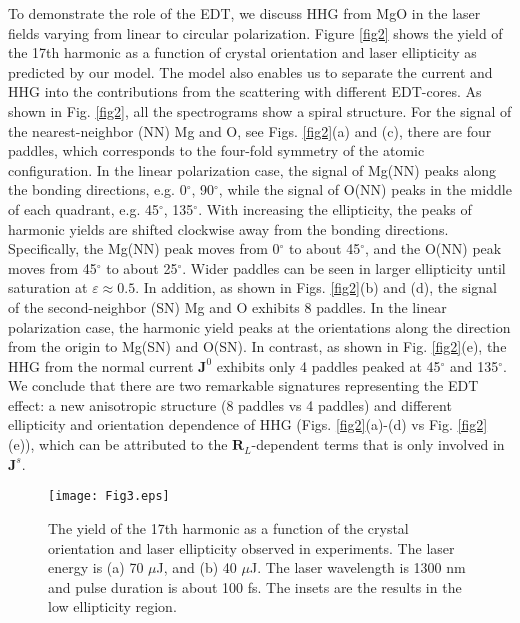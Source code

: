 \documentclass[aps,prl,10pt,preprint,nofootinbib]{revtex4-1}
\begin{document}
To demonstrate the role of the EDT, we discuss HHG from MgO in the laser fields varying from linear to circular polarization. Figure \ref{fig2} shows the yield of the 17th harmonic as a function of crystal orientation and laser ellipticity as predicted by our model. The model also enables us to separate the current and HHG into the contributions from the scattering with different EDT-cores. As shown in Fig. \ref{fig2}, all the spectrograms show a spiral structure. For the signal of the nearest-neighbor (NN) Mg and O, see Figs. \ref{fig2}(a) and (c), there are four paddles, which corresponds to the four-fold symmetry of the atomic configuration. In the linear polarization case, the signal of Mg(NN) peaks along the bonding directions, e.g. 0$^\circ$, 90$^\circ$, while the signal of O(NN) peaks in the middle of each quadrant, e.g. 45$^\circ$, 135$^\circ$. With increasing the ellipticity, the peaks of harmonic yields are shifted clockwise away from the bonding directions. Specifically, the Mg(NN) peak moves from 0$^\circ$ to about 45$^\circ$, and the O(NN) peak moves from 45$^\circ$ to about 25$^\circ$. Wider paddles can be seen in larger ellipticity until saturation at $\varepsilon\approx0.5$. In addition, as shown in Figs. \ref{fig2}(b) and (d), the signal of the second-neighbor (SN) Mg and O exhibits 8 paddles. In the linear polarization case, the harmonic yield peaks at the orientations along the direction from the origin to Mg(SN) and O(SN). In contrast, as shown in Fig. \ref{fig2}(e), the HHG from the normal current $\textbf{J}^{0}$ exhibits only 4 paddles peaked at 45$^\circ$ and 135$^\circ$. We conclude that there are two remarkable signatures representing the EDT effect: a new anisotropic structure (8 paddles vs 4 paddles) and different ellipticity and orientation dependence of HHG (Figs. \ref{fig2}(a)-(d) vs Fig. \ref{fig2}(e)), which can be attributed to the $\textbf{R}_{L}$-dependent terms that is only involved in $\textbf{J}^{s}$.

\begin{figure}[!t]
	\texttt{[image: Fig3.eps]}
	\caption{The yield of the 17th harmonic as a function of the crystal orientation and laser ellipticity observed in experiments. The laser energy is (a) 70 $\mu$J, and (b) 40 $\mu$J. The laser wavelength is 1300 nm and pulse duration is about 100 fs. The insets are the results in the low ellipticity region.}\label{fig3}
\end{figure}
\end{document}
